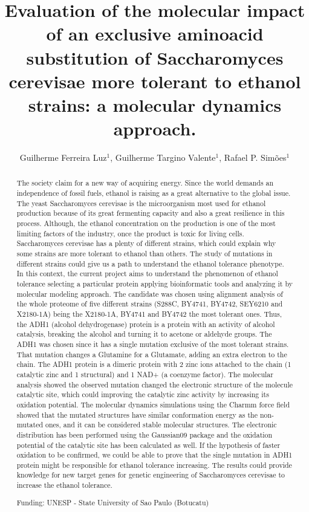 \documentclass[twoside]{article}
\title{\vspace{-15mm}\fontsize{24pt}{10pt}\selectfont\textbf{Evaluation of the molecular impact of an exclusive aminoacid substitution of Saccharomyces cerevisae more tolerant to ethanol strains:  a molecular dynamics approach.}} %
\author{Guilherme Ferreira Luz$^1$, Guilherme Targino Valente$^1$, Rafael P. Sim\~oes$^1$}
\affil{1 UNESP - STATE USP\\ }
\date{}
\begin{document}
\maketitle %

\thispagestyle{fancy} %


\begin{abstract}
The society claim for a new way of acquiring energy. Since the world demands an independence of fossil fuels, ethanol is raising as a great alternative to the global issue. The yeast Saccharomyces cerevisae is the microorganism most used for ethanol production because of its great fermenting capacity and also a great resilience in this process. Although, the ethanol concentration on the production is one of the most limiting factors of the industry, once the product is toxic for living cells. Saccharomyces cerevisae has a plenty of different strains, which could explain why some strains are more tolerant to ethanol than others. The study of mutations in different strains could give us a path to understand the ethanol tolerance phenotype. In this context, the current project aims to understand the phenomenon of ethanol tolerance selecting a particular protein applying bioinformatic tools and analyzing it by molecular modeling approach. The candidate was chosen using alignment analysis of the whole proteome of five different strains (S288C, BY4741, BY4742, SEY6210 and X2180-1A) being the X2180-1A, BY4741 and BY4742 the most tolerant ones. Thus, the ADH1 (alcohol dehydrogenase) protein is a protein with an activity of alcohol catalysis, breaking the alcohol and turning it to acetone or aldehyde groups. The ADH1 was chosen since it has a single mutation exclusive of the most tolerant strains. That mutation changes a Glutamine for a Glutamate, adding an extra electron to the chain. The ADH1 protein is a dimeric protein with 2 zinc ions attached to the chain (1 catalytic zinc and 1 structural) and 1 NAD+ (a coenzyme factor). The molecular analysis showed the observed mutation changed the electronic structure of the molecule catalytic site, which could improving the catalytic zinc activity by increasing its oxidation potential. The molecular dynamics simulations using the Charmm force field showed that the mutated structures have similar conformation energy as the non-mutated ones, and it can be considered stable molecular structures. The electronic distribution has been performed using the Gaussian09 package and the oxidation potential of the catalytic site has been calculated as well. If the hypothesis of faster oxidation to be confirmed, we could be able to prove that the single mutation in ADH1 protein might be responsible for ethanol tolerance increasing. The results could provide knowledge for new target genes for genetic engineering of Saccharomyces cerevisae to increase the ethanol tolerance.

Funding: UNESP - State University of Sao Paulo (Botucatu)
\end{abstract}
\end{document}
